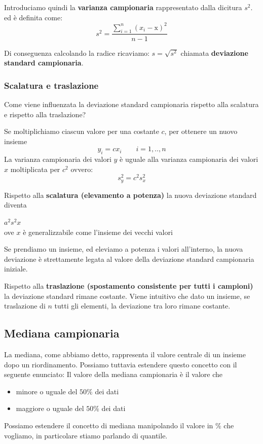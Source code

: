 Introduciamo quindi la \textbf{varianza campionaria} rappresentato dalla dicitura $s^2$. 
ed è definita come:
\begin{equation*}
s^2 = \frac{\sum_{i=1}^n (x_i - \text{\={x}}) ^2 }{n-1}
\end{equation*}

Di conseguenza calcolando la radice ricaviamo: $s = \sqrt{s^2}$ chiamata \textbf{deviazione standard campionaria}. 
\subsubsection{Scalatura e traslazione}
Come viene influenzata la deviazione standard campionaria rispetto alla scalatura e rispetto alla traslazione? 

Se moltiplichiamo ciascun valore per una costante $c$, per ottenere un nuovo insieme
\begin{equation*}
y_i = cx_i \qquad i = 1, .. , n
\end{equation*}
La varianza campionaria dei valori $y$ è uguale alla varianza campionaria dei valori $x$ moltiplicata per $c^2$ ovvero:
\begin{equation*}
s^2_y = c^2s^2_x
\end{equation*}

Rispetto alla \textbf{scalatura (elevamento a potenza)} la nuova deviazione standard diventa
\begin{center}
$a^2s^2x$\\
ove $x$ è generalizzabile come l'insieme dei vecchi valori
\end{center}
Se prendiamo un insieme, ed eleviamo a potenza i valori all'interno, la nuova deviazione è strettamente legata al valore della deviazione standard campionaria iniziale.

Rispetto alla \textbf{traslazione (spostamento consistente per tutti i campioni)} la deviazione standard rimane costante. Viene intuitivo che dato un insieme, se traslazione di $n$ tutti gli elementi, la deviazione tra loro rimane costante.

\subsection{Mediana campionaria}
La mediana, come abbiamo detto, rappresenta il valore centrale di un insieme dopo un riordinamento. Possiamo tuttavia estendere questo concetto con il seguente enunciato:
Il valore della mediana campionaria è il valore che \begin{itemize}
\item minore o uguale del $50\%$ dei dati
\item maggiore o uguale del $50\%$ dei dati
\end{itemize}
Possiamo estendere il concetto di mediana manipolando il valore in \% che vogliamo, in particolare stiamo parlando di quantile. 
